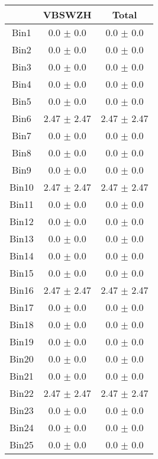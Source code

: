   \begin{tabular}{|c|c|c|}
  \hline
      & VBSWZH & Total \\ \cline{1-3} 
     \hline\hline
     Bin1 & 0.0 $\pm$ 0.0 & 0.0 $\pm$ 0.0 \\ \cline{1-3} 
     Bin2 & 0.0 $\pm$ 0.0 & 0.0 $\pm$ 0.0 \\ \cline{1-3} 
     Bin3 & 0.0 $\pm$ 0.0 & 0.0 $\pm$ 0.0 \\ \cline{1-3} 
     Bin4 & 0.0 $\pm$ 0.0 & 0.0 $\pm$ 0.0 \\ \cline{1-3} 
     Bin5 & 0.0 $\pm$ 0.0 & 0.0 $\pm$ 0.0 \\ \cline{1-3} 
     Bin6 & 2.47 $\pm$ 2.47 & 2.47 $\pm$ 2.47 \\ \cline{1-3} 
     Bin7 & 0.0 $\pm$ 0.0 & 0.0 $\pm$ 0.0 \\ \cline{1-3} 
     Bin8 & 0.0 $\pm$ 0.0 & 0.0 $\pm$ 0.0 \\ \cline{1-3} 
     Bin9 & 0.0 $\pm$ 0.0 & 0.0 $\pm$ 0.0 \\ \cline{1-3} 
     Bin10 & 2.47 $\pm$ 2.47 & 2.47 $\pm$ 2.47 \\ \cline{1-3} 
     Bin11 & 0.0 $\pm$ 0.0 & 0.0 $\pm$ 0.0 \\ \cline{1-3} 
     Bin12 & 0.0 $\pm$ 0.0 & 0.0 $\pm$ 0.0 \\ \cline{1-3} 
     Bin13 & 0.0 $\pm$ 0.0 & 0.0 $\pm$ 0.0 \\ \cline{1-3} 
     Bin14 & 0.0 $\pm$ 0.0 & 0.0 $\pm$ 0.0 \\ \cline{1-3} 
     Bin15 & 0.0 $\pm$ 0.0 & 0.0 $\pm$ 0.0 \\ \cline{1-3} 
     Bin16 & 2.47 $\pm$ 2.47 & 2.47 $\pm$ 2.47 \\ \cline{1-3} 
     Bin17 & 0.0 $\pm$ 0.0 & 0.0 $\pm$ 0.0 \\ \cline{1-3} 
     Bin18 & 0.0 $\pm$ 0.0 & 0.0 $\pm$ 0.0 \\ \cline{1-3} 
     Bin19 & 0.0 $\pm$ 0.0 & 0.0 $\pm$ 0.0 \\ \cline{1-3} 
     Bin20 & 0.0 $\pm$ 0.0 & 0.0 $\pm$ 0.0 \\ \cline{1-3} 
     Bin21 & 0.0 $\pm$ 0.0 & 0.0 $\pm$ 0.0 \\ \cline{1-3} 
     Bin22 & 2.47 $\pm$ 2.47 & 2.47 $\pm$ 2.47 \\ \cline{1-3} 
     Bin23 & 0.0 $\pm$ 0.0 & 0.0 $\pm$ 0.0 \\ \cline{1-3} 
     Bin24 & 0.0 $\pm$ 0.0 & 0.0 $\pm$ 0.0 \\ \cline{1-3} 
     Bin25 & 0.0 $\pm$ 0.0 & 0.0 $\pm$ 0.0 \\ \cline{1-3} 

\end{tabular}
